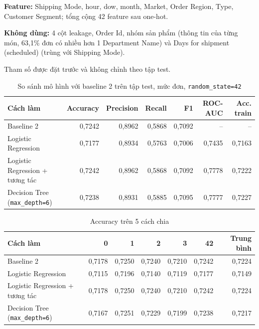 \documentclass[11pt,a4paper]{article}
\newcommand{\col}[1]{\textsf{#1}}
\begin{document}
\textbf{Feature:} \col{Shipping Mode}, \col{hour}, \col{dow}, \col{month}, \col{Market}, \col{Order Region}, \col{Type}, \col{Customer Segment}; tổng cộng 42 feature sau one-hot.

\textbf{Không dùng:} 4 cột leakage, \col{Order Id}, nhóm sản phẩm (thông tin của từng món, 63,1\% đơn có nhiều hơn 1 \col{Department Name}) và \col{Days for shipment (scheduled)} (trùng với \col{Shipping Mode}).

Tham số được đặt trước và không chỉnh theo tập test.

\begin{table}[H]\centering\small
\caption{So sánh mô hình với baseline 2 trên tập test, mức đơn, \texttt{random\_state=42}}
\begin{tabular}{lrrrrrr}
\toprule
\textbf{Cách làm} & \textbf{Accuracy} & \textbf{Precision} & \textbf{Recall} & \textbf{F1} & \textbf{ROC-AUC} & \textbf{Acc. train} \\
\midrule
Baseline 2 & 0,7242 & 0,8962 & 0,5868 & 0,7092 & -- & -- \\
Logistic Regression & 0,7177 & 0,8934 & 0,5763 & 0,7006 & 0,7435 & 0,7163 \\
Logistic Regression + tương tác & 0,7242 & 0,8962 & 0,5868 & 0,7092 & 0,7778 & 0,7222 \\
Decision Tree (\texttt{max\_depth=6}) & 0,7238 & 0,8931 & 0,5885 & 0,7095 & 0,7777 & 0,7227 \\
\bottomrule
\end{tabular}
\end{table}

\begin{table}[H]\centering\small
\caption{Accuracy trên 5 cách chia}
\begin{tabular}{lrrrrrr}
\toprule
\textbf{Cách làm} & \textbf{0} & \textbf{1} & \textbf{2} & \textbf{3} & \textbf{42} & \textbf{Trung bình} \\
\midrule
Baseline 2 & 0,7178 & 0,7250 & 0,7240 & 0,7210 & 0,7242 & 0,7224 \\
Logistic Regression & 0,7115 & 0,7196 & 0,7140 & 0,7119 & 0,7177 & 0,7149 \\
Logistic Regression + tương tác & 0,7178 & 0,7250 & 0,7240 & 0,7210 & 0,7242 & 0,7224 \\
Decision Tree (\texttt{max\_depth=6}) & 0,7167 & 0,7251 & 0,7229 & 0,7199 & 0,7238 & 0,7217 \\
\bottomrule
\end{tabular}
\end{table}
\end{document}

